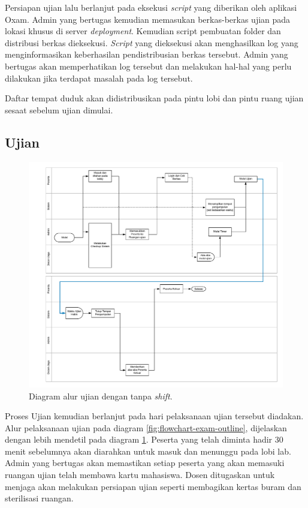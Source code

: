         Persiapan ujian lalu berlanjut pada eksekusi \textit{script} yang
        diberikan oleh aplikasi Oxam. Admin yang bertugas kemudian memasukan
        berkas-berkas ujian pada lokasi khusus di server \textit{deployment}.
        Kemudian script pembuatan folder dan distribusi berkas dieksekusi.
        \textit{Script} yang dieksekusi akan menghasilkan log yang
        menginformasikan keberhasilan pendistribusian berkas tersebut. Admin
        yang bertugas akan memperhatikan log tersebut dan melakukan hal-hal yang
        perlu dilakukan jika terdapat masalah pada log tersebut.
        
        Daftar tempat duduk akan didistribusikan pada pintu lobi dan pintu ruang
        ujian sesaat sebelum ujian dimulai.
    
    \subsection{Ujian}
        \begin{figure}
            \centering
            \includegraphics[height=0.8\paperwidth]{Gambar/flowchart/exam-flow-ujian-no-shift.pdf}
            \caption{Diagram alur ujian dengan tanpa \textit{shift}.}
            \label{fig:flowchart-exam-exam-noshift}
        \end{figure}
        Proses Ujian kemudian berlanjut pada hari pelaksanaan ujian tersebut
        diadakan. Alur pelaksanaan ujian pada diagram
        \ref{fig:flowchart-exam-outline}, dijelaskan dengan lebih mendetil pada
        diagram \ref{fig:flowchart-exam-exam-noshift}. Peserta yang telah
        diminta hadir 30 menit sebelumnya akan diarahkan untuk masuk dan
        menunggu pada lobi lab. Admin yang bertugas akan memastikan setiap
        peserta yang akan memasuki ruangan ujian telah membawa kartu mahasiswa.
        Dosen ditugaskan untuk menjaga akan melakukan persiapan ujian seperti
        membagikan kertas buram dan sterilisasi ruangan.
        
